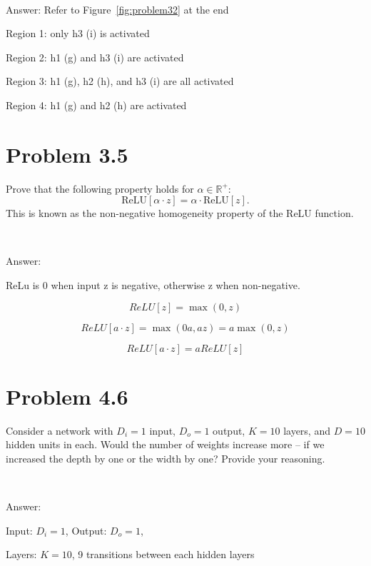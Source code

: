 \documentclass[10pt]{article}
\begin{document}
\ 

\noindent Answer: Refer to Figure~\ref{fig:problem32} at the end

\noindent Region 1: only h3 (i) is activated 

\noindent Region 2: h1 (g) and h3 (i) are activated
 
\noindent Region 3: h1 (g), h2 (h), and h3 (i) are all activated

\noindent Region 4: h1 (g) and h2 (h) are activated



\vspace{2em}

\section*{Problem 3.5}

Prove that the following property holds for $\alpha \in \mathbb{R}^+$:
\[
\text{ReLU}[\alpha \cdot z] = \alpha \cdot \text{ReLU}[z].
\]
This is known as the non-negative homogeneity property of the ReLU function.

\ 

\noindent Answer:

\noindent ReLu is 0 when input z is negative, otherwise z when non-negative. 

$$ ReLU[z] = \max(0, z) $$

$$ ReLU[a \cdot z] = \max(0a , az) = a \max(0, z)  $$

$$ ReLU[a \cdot z] = a ReLU[z] $$ 





\vspace{2em}

\section*{Problem 4.6}

Consider a network with $D_i = 1$ input, $D_o = 1$ output, $K = 10$ layers, and $D = 10$ hidden units in each. Would the number of weights increase more -- if we increased the depth by one or the width by one? Provide your reasoning.



\ 

\noindent Answer:

\noindent  Input: $D_i = 1$, Output: $D_o = 1$,

\noindent Layers: $K = 10$, 9 transitions between each hidden layers
\end{document}
